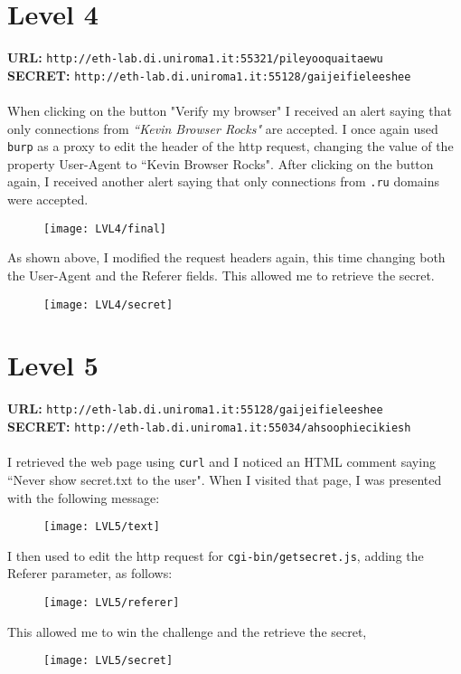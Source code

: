 \documentclass[12pt,a4paper]{article}
\begin{document}
	\section*{Level 4}
	\textbf{URL: }\texttt{http://eth-lab.di.uniroma1.it:55321/pileyooquaitaewu}\\
	\textbf{SECRET: }\texttt{http://eth-lab.di.uniroma1.it:55128/gaijeifieleeshee}\\\\
	When clicking on the button "Verify my browser" I received an alert saying that only connections from \textit{``Kevin Browser Rocks"} are accepted. I once again used \texttt{burp} as a proxy to edit the header of the http request, changing the value of the property User-Agent to ``Kevin Browser Rocks". After clicking on the button again, I received another alert saying that only connections from \texttt{.ru} domains were accepted.\\
	\begin{figure}[H]
		\centering
		\texttt{[image: LVL4/final]}
		\label{fig:russian4}
	\end{figure}
	As shown above, I modified the request headers again, this time changing both the User-Agent and the Referer fields. This allowed me to retrieve the secret.
	\begin{figure}[H]
		\centering
		\texttt{[image: LVL4/secret]}
		\label{fig:secret4}
	\end{figure}
	\newpage

	\section*{Level 5}
	\textbf{URL: }\texttt{http://eth-lab.di.uniroma1.it:55128/gaijeifieleeshee}\\
	\textbf{SECRET: }\texttt{http://eth-lab.di.uniroma1.it:55034/ahsoophiecikiesh }\\\\
	I retrieved the web page using \texttt{curl} and I noticed an HTML comment saying ``Never show secret.txt to the user". When I visited that page, I was presented with the following message:
	\begin{figure}[H]
		\centering
		\texttt{[image: LVL5/text]}
		\label{fig:comment5}
	\end{figure}
	I then used  to edit the http request for \texttt{cgi-bin/getsecret.js}, adding the Referer parameter, as follows:
	\begin{figure}[H]
		\centering
		\texttt{[image: LVL5/referer]}
		\label{fig:referer5}
	\end{figure}
	This allowed me to win the challenge and the retrieve the secret,
	\begin{figure}[H]
		\centering
		\texttt{[image: LVL5/secret]}
		\label{fig:secret5}
	\end{figure}
\end{document}
